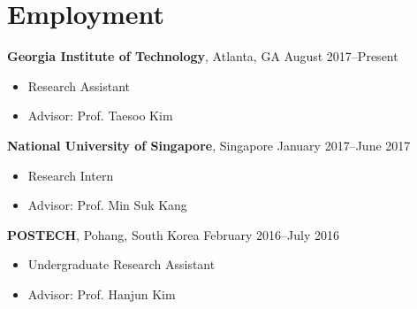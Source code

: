 \section*{Employment}

\begin{description}
\item {\bf Georgia Institute of Technology}, Atlanta, GA \dotfill August 2017--Present
  \begin{itemize}
  \item Research Assistant
  \item Advisor: Prof. Taesoo Kim
  \end{itemize}
  
\item {\bf National University of Singapore}, Singapore \dotfill January 2017--June 2017
  \begin{itemize}
  \item Research Intern
  \item Advisor: Prof. Min Suk Kang
  \end{itemize}

\item {\bf POSTECH}, Pohang, South Korea \dotfill February 2016--July 2016
  \begin{itemize}
  \item Undergraduate Research Assistant
  \item Advisor: Prof. Hanjun Kim
  \end{itemize}
\end{description}
